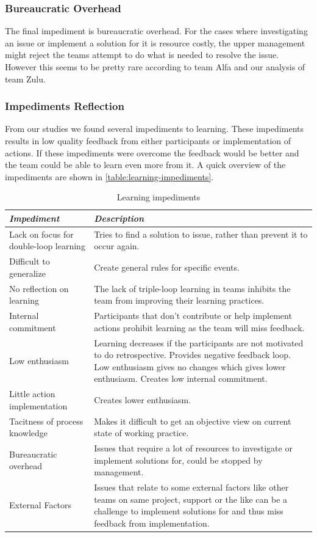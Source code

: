 \subsubsection{Bureaucratic Overhead}
The final impediment is bureaucratic overhead. For the cases where investigating an issue or implement a solution for it is resource costly, the upper management might reject the teams attempt to do what is needed to resolve the issue. However this seems to be pretty rare according to team Alfa and our analysis of team Zulu. 

\subsubsection{Impediments Reflection}
From our studies we found several impediments to learning. These impediments results in low quality feedback from either participants or implementation of actions. If these impediments were overcome the feedback would be better and the team could be able to learn even more from it. A quick overview of the impediments are shown in \autoref{table:learning-impediments}.

\begin{table}[h]
	\begin{center}
		\caption{Learning impediments}
		\label{table:learning-impediments}
		\begin{tabular}{p{} p{}}
			\hline
			\textit{Impediment} & \textit{Description} \\
			\hline
			Lack on focus for double-loop learning & Tries to find a solution to issue, rather than prevent it to occur again. \\
			Difficult to generalize & Create general rules for specific events. \\
			No reflection on learning & The lack of triple-loop learning in teams inhibits the team from improving their learning practices. \\
			Internal commitment & Participants that don't contribute or help implement actions prohibit learning as the team will miss feedback. \\ 
			Low enthusiasm & Learning decreases if the participants are not motivated to do retrospective. Provides negative feedback loop. Low enthusiasm gives no changes which gives lower enthusiasm. Creates low internal commitment. \\
			Little action implementation & Creates lower enthusiasm. \\
			Tacitness of process knowledge & Makes it difficult to get an objective view on current state of working practice. \\
			Bureaucratic overhead & Issues that require a lot of resources to investigate or implement solutions for, could be stopped by management. \\
			External Factors & Issues that relate to some external factors like other teams on same project, support or the like can be a challenge to implement solutions for and thus miss feedback from implementation.\\
			\hline
		\end{tabular}
	\end{center}
\end{table}

